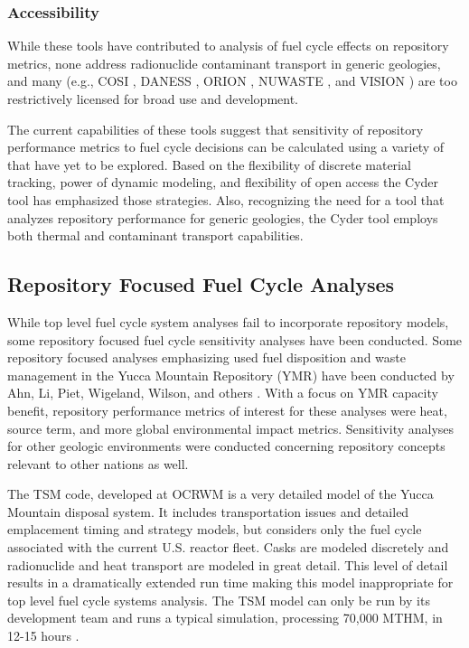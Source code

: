 \subsubsection{Accessibility}

While these tools have contributed to analysis of fuel cycle effects on 
repository metrics, none address radionuclide contaminant transport in generic 
geologies, and many (e.g.,
\gls{COSI} \cite{boucher_international_2010},
\gls{DANESS} \cite{yacout_daness_2011,van_den_durpel_daness:_2006}, 
ORION \cite{gregg_orion_2011},
\gls{NUWASTE} \cite{abkowitz_nuclear_2010}, and
\gls{VISION} \cite{yacout_vision_2006, wilson_comparing_2011, radel_repository_2007, boucher_international_2010}
) are too restrictively licensed for broad use and development. 


The current capabilities of these tools suggest that sensitivity of repository 
performance metrics to fuel cycle decisions can be calculated using a variety of 
that have yet to be explored. Based on the flexibility of discrete material 
tracking, power of dynamic modeling, and flexibility of open access the Cyder 
tool has emphasized those strategies. Also, recognizing the need for a tool 
that analyzes repository performance for generic geologies, the Cyder tool 
employs both thermal and contaminant transport capabilities.

\subsection{Repository Focused Fuel Cycle Analyses}

While top level fuel cycle system analyses fail to incorporate repository 
models, some repository focused fuel cycle sensitivity analyses have been conducted. 
Some repository focused analyses emphasizing used fuel disposition and
waste management in the Yucca Mountain Repository (YMR) have been conducted by
Ahn, Li, Piet, Wigeland, Wilson, and others . With a focus on YMR capacity benefit, 
repository performance metrics of interest for these analyses were heat, source 
term, and more global environmental impact metrics.  Sensitivity analyses for 
other geologic environments were conducted concerning repository concepts relevant to other
nations as well. 

The \gls{TSM} code, 
developed at \gls{OCRWM} is a very detailed model of the Yucca Mountain disposal 
system. It includes transportation issues and detailed emplacement timing and 
strategy models, but considers only the fuel cycle associated with the current  
U.S.  reactor fleet. Casks are modeled discretely and radionuclide and heat transport 
are modeled in great detail.  This level of detail results in a dramatically extended
run time making this model inappropriate for top level fuel cycle systems analysis. 
The \gls{TSM} model can only be run by its development team and runs a typical 
simulation, processing 70,000 MTHM, in 12-15 hours \cite{turner_discrete_2010}. 

